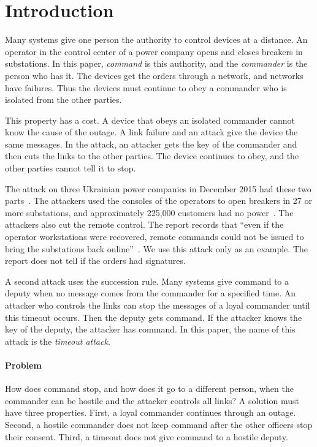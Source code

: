 \section{Introduction}
\label{sec:intro}

Many systems give one person the authority to control devices at a distance. An operator in
the control center of a power company opens and closes breakers in substations. In this
paper, \emph{command} is this authority, and the \emph{commander} is the person who has it.
The devices get the orders through a network, and networks have failures. Thus the devices
must continue to obey a commander who is isolated from the other parties.

This property has a cost. A device that obeys an isolated commander cannot know the cause
of the outage. A link failure and an attack give the device the same messages. In the
attack, an attacker gets the key of the commander and then cuts the links to the other
parties. The device continues to obey, and the other parties cannot tell it to stop.

The attack on three Ukrainian power companies in December 2015 had these two
parts~\cite{eisac2016ukraine}. The attackers used the consoles of the operators to open
breakers in 27 or more substations, and approximately 225{,}000 customers had no
power~\cite[p.~8]{eisac2016ukraine}. The attackers also cut the remote control. The report
records that ``even if the operator workstations were recovered, remote commands could not
be issued to bring the substations back online''~\cite[p.~9]{eisac2016ukraine}. We use this
attack only as an example. The report does not tell if the orders had signatures.

A second attack uses the succession rule. Many systems give command to a deputy when no
message comes from the commander for a specified time. An attacker who controls the links
can stop the messages of a loyal commander until this timeout occurs. Then the deputy gets
command. If the attacker knows the key of the deputy, the attacker has command. In this
paper, the name of this attack is the \emph{timeout attack}.

\paragraph{Problem}
How does command stop, and how does it go to a different person, when the commander can be
hostile and the attacker controls all links? A solution must have three properties. First,
a loyal commander continues through an outage. Second, a hostile commander does not keep
command after the other officers stop their consent. Third, a timeout does not give command
to a hostile deputy.

